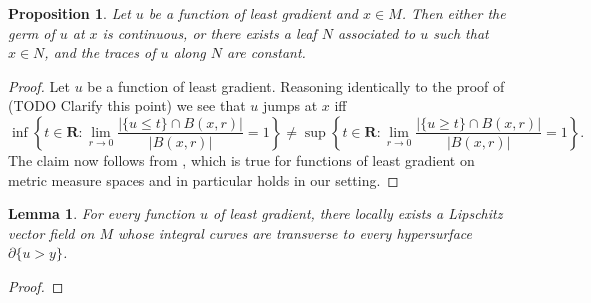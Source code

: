 \documentclass[reqno,10pt]{amsart}
\newcommand{\RR}{\mathbf{R}}
\DeclareMathOperator{\supp}{supp}
\newcommand*\dif{\mathop{}\!\mathrm{d}}
\newcommand{\normal}{\mathbf n}
\newcommand{\loc}{\mathrm{loc}}
\newtheorem{lemma}[theorem]{Lemma}
\newtheorem{proposition}[theorem]{Proposition}
\theoremstyle{definition}
\numberwithin{equation}{section}
\begin{document}
\begin{proposition}
Let $u$ be a function of least gradient and $x \in M$. Then either the germ of $u$ at $x$ is continuous, or there exists a leaf $N$ associated to $u$ such that $x \in N$, and the traces of $u$ along $N$ are constant.
\end{proposition}
\begin{proof}
Let $u$ be a function of least gradient.
Reasoning identically to the proof of \cite[Proposition 3.9]{górny2017planar} (TODO Clarify this point) we see that $u$ jumps at $x$ iff
$$\inf\left\{t \in \RR: \lim_{r \to 0} \frac{|\{u \leq t\} \cap B(x, r)|}{|B(x, r)|} = 1\right\} \neq \sup\left\{t \in \RR: \lim_{r \to 0} \frac{|\{u \geq t\} \cap B(x, r)|}{|B(x, r)|} = 1\right\}.$$
The claim now follows from \cite[Theorem 4.1]{HakkarainenKorteLahtiShanmugalingam+2015}, which is true for functions of least gradient on metric measure spaces and in particular holds in our setting.
\end{proof}

\begin{lemma}
For every function $u$ of least gradient, there locally exists a Lipschitz vector field on $M$ whose integral curves are transverse to every hypersurface $\partial \{u > y\}$.
\end{lemma}
\begin{proof}


\end{proof}
\end{document}
